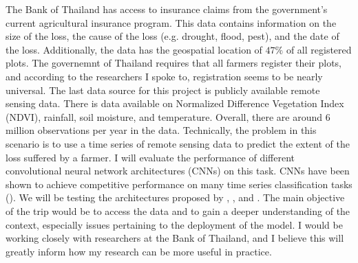 \documentclass[12pt]{article}
\begin{document}
The Bank of Thailand has access to insurance claims from the government's current agricultural insurance program. This data contains information on the size of the loss, the cause of the loss (e.g. drought, flood, pest), and the date of the loss. Additionally, the data has the geospatial location of $47\%$ of all registered plots. The governemnt of Thailand requires that all farmers register their plots, and according to the researchers I spoke to, registration seems to be nearly universal. The last data source for this project is publicly available remote sensing data. There is data available on Normalized Difference Vegetation Index (NDVI), rainfall, soil moisture, and temperature. Overall, there are around 6 million observations per year in the data. Technically, the problem in this scenario is to use a time series of remote sensing data to predict the extent of the loss suffered by a farmer. I will evaluate the performance of different convolutional neural network architectures (CNNs) on this task. CNNs have been shown to achieve competitive performance on many time series classification tasks (\cite{wang2017time}). We will be testing the architectures proposed by \cite{bai2018empirical}, \cite{cui2016multi}, and \cite{wang2017time}. The main objective of the trip would be to access the data and to gain a deeper understanding of the context, especially issues pertaining to the deployment of the model. I would be working closely with researchers at the Bank of Thailand, and I believe this will greatly inform how my research can be more useful in practice. 

    
\end{document}
